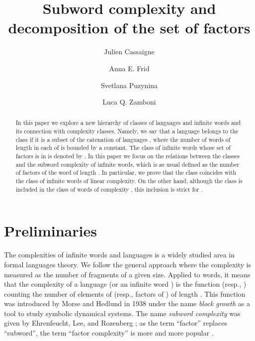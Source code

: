 \documentclass[runningheads,envcountsect,envcountsame]{llncs}
\begin{document}
\author{Julien Cassaigne \and Anna E. Frid \and Svetlana Puzynina \and Luca Q. Zamboni }
\title{Subword complexity and decomposition of the set of factors}


\maketitle

\begin{abstract}
In this paper we explore a new hierarchy of classes of languages
and infinite words and its connection with complexity
classes. Namely, we say that a language belongs to the class  if it is a
subset of the catenation of  languages , where the number of words of
length  in each of  is bounded by a constant.
The class of infinite words whose set of factors is in  is denoted by
. In this paper we focus on the relations between the classes  and the subword complexity
of infinite words, which is as usual defined as the number of factors of the word of length . In particular, we prove that the class  coincides with the class of
 infinite words of linear complexity. On the
other hand, although the class 
is included in the class of words of complexity , this
inclusion is strict for .
\end{abstract}

\section{Preliminaries}

The complexities of infinite words and languages is a widely
studied area in formal languages theory. We follow the general approach where the complexity is measured as the number of fragments of a given size. Applied to words, it means that the complexity of a language  (or an infinite word ) is the function  (resp., ) counting the number of elements of  (resp., factors of ) of length . This function was introduced
by  Morse and Hedlund in 1938 \cite{MoHe1} under the name
\emph{block growth} as a tool to study symbolic dynamical
systems. The name \emph{subword complexity} was given by Ehrenfeucht,
Lee, and Rozenberg \cite{elr}; as the term ``factor'' replaces ``subword'', the term ``factor complexity'' is more and more popular \cite{cas_livre}.
\end{document}
